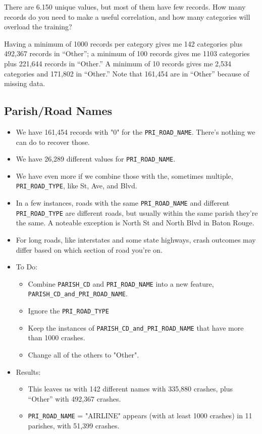 	There are 6.150 unique values, but most of them have few records.  How many records do you need to make a useful correlation, and how many categories will overload the training?
	
	Having a minimum of 1000 records per category gives me 142 categories plus 492,367 records in ``Other''; a minimum of 100 records gives me 1103 categories plus 221,644 records in ``Other.''  A minimum of 10 records gives me 2,534 categories and 171,802 in ``Other.''  Note that 161,454 are in ``Other'' because of missing data.


\subsection{Parish/Road Names}

\begin{itemize}
	\item We have 161,454 records with "0" for the \verb|PRI_ROAD_NAME|.  There's nothing we can do to recover those.  
	\item  We have 26,289 different values for \verb|PRI_ROAD_NAME|.  
	\item We have even more if we combine those with the, sometimes multiple, \verb|PRI_ROAD_TYPE|, like St, Ave, and Blvd.
 \item In a few instances, roads with the same \verb|PRI_ROAD_NAME| and different \verb|PRI_ROAD_TYPE| are different roads, but usually within the same parish they're the same.  A noteable exception is North St and North Blvd in Baton Rouge.
 \item For long roads, like interstates and some state highways, crash outcomes may differ based on which section of road you're on.
 \item To Do:
 	\begin{itemize}
		\item Combine  \verb|PARISH_CD| and \verb|PRI_ROAD_NAME| into a new feature,  \verb|PARISH_CD_and_PRI_ROAD_NAME|.
		\item Ignore the \verb|PRI_ROAD_TYPE|
		\item Keep the instances of  \verb|PARISH_CD_and_PRI_ROAD_NAME| that have more than 1000 crashes.  
		\item Change all of the others to "Other".
	\end{itemize}
 \item Results:
 	\begin{itemize}
		\item This leaves us with 142 different names with 335,880 crashes, plus ``Other'' with 492,367 crashes.  
		\item \verb|PRI_ROAD_NAME| = "AIRLINE" appears (with at least 1000 crashes) in 11 parishes, with 51,399 crashes.
	\end{itemize}
   \end{itemize}


